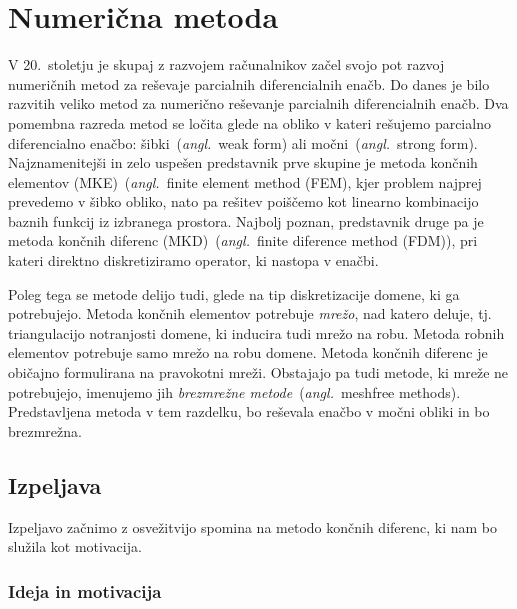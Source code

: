 \documentclass[12pt,a4paper]{article}
\theoremstyle{definition} %
\theoremstyle{plain} %
\numberwithin{equation}{section}
\newcommand{\ang}[1]{(\textit{angl.}\ #1)}
\begin{document}
\section{Numerična metoda}
\label{sec:numericna-metoda}

V 20.~stoletju je skupaj z razvojem računalnikov začel svojo pot razvoj numeričnih
metod za reševaje parcialnih diferencialnih enačb. Do danes je bilo razvitih
veliko metod za numerično reševanje parcialnih diferencialnih enačb. Dva
pomembna razreda metod se ločita glede na obliko v kateri rešujemo parcialno
diferencialno enačbo: šibki~\ang{weak form} ali močni~\ang{strong form}.
Najznamenitejši in zelo uspešen predstavnik prve skupine je metoda končnih
elementov (MKE)~\ang{finite element method (FEM}, kjer problem najprej prevedemo
v šibko obliko, nato pa rešitev poiščemo kot linearno kombinacijo baznih
funkcij iz izbranega prostora. Najbolj poznan, predstavnik druge pa je metoda
končnih diferenc (MKD)~\ang{finite diference method (FDM)}, pri kateri
direktno diskretiziramo operator, ki nastopa v enačbi.

Poleg tega se metode delijo tudi, glede na tip diskretizacije domene, ki ga
potrebujejo. Metoda končnih elementov potrebuje \emph{mrežo}, nad katero deluje,
tj. triangulacijo notranjosti domene, ki inducira tudi mrežo na robu.
Metoda robnih elementov potrebuje samo mrežo na robu domene. Metoda končnih
diferenc je običajno formulirana na pravokotni mreži. Obstajajo pa tudi
metode, ki mreže ne potrebujejo, imenujemo jih \emph{brezmrežne
metode}~\ang{meshfree methods}. Predstavljena metoda v tem razdelku, bo reševala
enačbo v močni obliki in bo brezmrežna.

\subsection{Izpeljava}

Izpeljavo začnimo z osvežitvijo spomina na metodo končnih diferenc, ki nam bo
služila kot motivacija.

\subsubsection{Ideja in motivacija}
\end{document}
